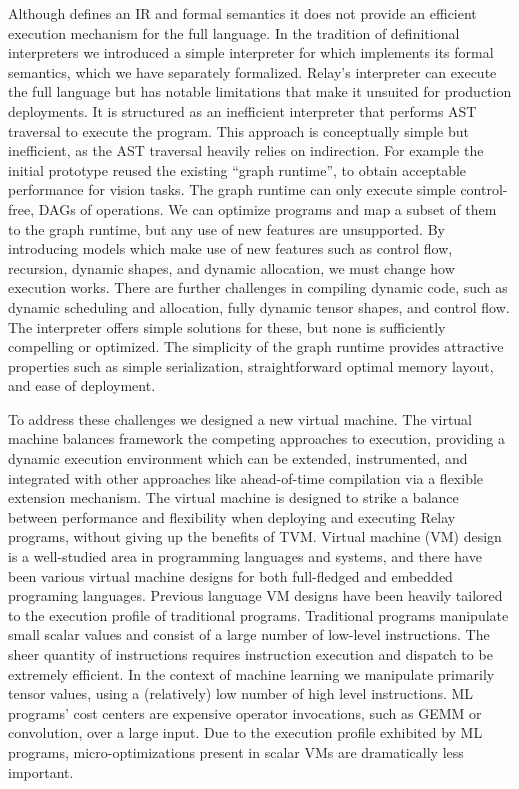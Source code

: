 Although \relay defines an IR and formal semantics
  it does not provide an efficient execution mechanism for the full language.
In the tradition of definitional interpreters we introduced
  a simple interpreter for \relay which implements its formal semantics, which
  we have separately formalized.
Relay’s interpreter can execute the full language but has notable limitations
  that make it unsuited for production deployments.
It is structured as an inefficient interpreter that performs AST traversal to execute the program.
This approach is conceptually simple but inefficient, as the AST traversal heavily relies on indirection.
For example the initial \relay prototype reused the existing ``graph runtime'', to obtain
  acceptable performance for vision tasks.
The graph runtime can only execute simple control-free,
  DAGs of operations.
We can optimize \relay programs and map a subset of them
  to the graph runtime, but any use of new \relay features
  are unsupported.
By introducing models which make use of new features such
  as control flow, recursion, dynamic shapes, and dynamic allocation,
  we must change how execution works.
There are further challenges in compiling dynamic code, such as dynamic scheduling and allocation,
  fully dynamic tensor shapes, and control flow.
The interpreter offers simple solutions for these, but none is sufficiently compelling or optimized.
The simplicity of the graph runtime provides attractive
  properties such as simple serialization, straightforward
  optimal memory layout, and ease of deployment.

To address these challenges we designed a new \relay
  virtual machine.
The \relay virtual machine balances framework the competing approaches to execution,
  providing a dynamic execution environment which can be extended, instrumented, and integrated with other approaches
  like ahead-of-time compilation via a flexible extension mechanism.
The virtual machine is designed to strike a balance between performance and flexibility
  when deploying and executing Relay programs, without giving up the benefits of TVM.
Virtual machine (VM) design is a well-studied area in programming languages and systems,
  and there have been various virtual machine designs for both full-fledged and embedded programing languages.
Previous language VM designs have been heavily tailored to the execution profile of traditional programs.
Traditional programs manipulate small scalar values
  and consist of a large number of low-level instructions.
The sheer quantity of instructions requires instruction execution
  and dispatch to be extremely efficient.
In the context of machine learning we manipulate primarily tensor values,
  using a (relatively) low number of high level instructions.
ML programs’ cost centers are expensive operator invocations,
  such as GEMM or convolution, over a large input.
Due to the execution profile exhibited by ML programs,
  micro-optimizations present in scalar VMs are dramatically less important.

